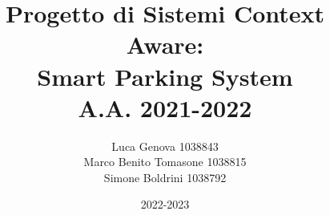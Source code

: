 \documentclass[12pt, a4paper]{report}
\author{Luca Genova  1038843\\ 
Marco Benito Tomasone 1038815\\
Simone Boldrini 1038792\\}
\date{2022-2023}
\title{Progetto di Sistemi Context Aware:\\
Smart Parking System\\
A.A. 2021-2022}
\begin{document}
\maketitle
\tableofcontents












\nocite{*}
\end{document}
